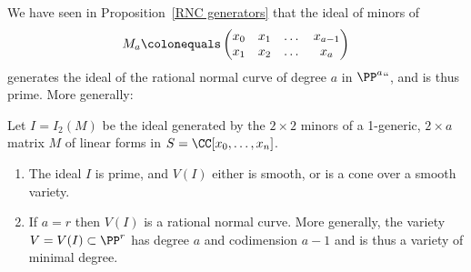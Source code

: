 We have seen in Proposition~\ref{RNC generators} that the ideal of
minors of
$$
M_{a}\colonequals
\begin{pmatrix}
x_0&x_1&\dots&x_{a-1}\\
x_1&x_2&\dots&x_{a}\\
\end{pmatrix}
$$
generates the ideal of the rational normal curve of degree $a$ in $\PP^a`
`$, and is thus prime. More generally:

\begin{theorem}\label{1-generic basics}
Let $I = I_2(M)$  be the ideal generated by the $2\times 2$ minors of
a 1-generic, $2\times a$ matrix $M$
of linear forms in $S = \CC[x_0,\dots, x_n]$.
\begin{enumerate}

\item The ideal $I$ is prime, and $V(I)$ either is smooth, or is a cone
over a smooth variety.

\item If $a=r$ then $V(I)$ is a rational normal curve. More generally,
the variety $V = V(I) \subset \PP^r$ has degree $a$ and codimension $a-1$
and is thus a variety of minimal degree.
\unif
\end{enumerate}
\end{theorem}

